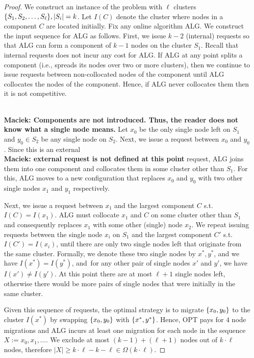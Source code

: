 \documentclass[manuscript,screen=true]{acmart}
\newcommand{\ALG}{\textsf{ALG}\xspace}
\newcommand{\PPOBRP}{PP-BRP}
\DeclarePairedDelimiter\set{\{}{\}}
\newcommand\maciek[1]{\color{brown}\textbf{\\ Maciek: #1}\color{black}}
\begin{document}
\begin{proof}
	We construct an instance of the problem with $\ell$ clusters 
	$\set{ S_1, S_2,\dots , S_{\ell}}, |S_i|  = k$.
	Let $I(C)$ denote the cluster where nodes in a component $C$ are located initially.
	Fix any online algorithm \ALG{}.
	We construct the input sequence for \ALG{} as follows.
	First,
	we issue $k-2$ (internal) requests so that \ALG{} can form a component of $k-1$
	nodes on the cluster $S_1$.
	Recall that internal requests does not incur any cost for \ALG{}.
	If \ALG{} at any point splits a component
	(i.e., spreads its nodes over two or more clusters),
	then we continue to issue requests between non-collocated nodes of the component until \ALG{} collocates the nodes of the component.
	Hence, if \ALG{} never collocates them then it is not competitive.
  
  \maciek{Components are not introduced. Thus, the reader does not know what a single node means.}
	Let $x_0$  be the only single node left on $S_1$ and  $y_0 \in S_2$ be any single node on $S_2$.
	Next,
	we issue a request between $x_0$ and $y_0$.
	Since this is an external \maciek{external request is not defined at this point} request,
	\ALG{} joins them into one component and collocates them in some cluster other than $S_1$.
	For this,
	\ALG{} moves to a new configuration
	that replaces $x_0$ and $y_0$ with two other single nodes $x_1$ and $y_1$ respectively.
	
	Next,
	we issue a request between $x_1$ and the largest component $C$ s.t.~$I(C) = I(x_1)$.
	\ALG{} must collocate $x_1$ and $C$ on some cluster other than $S_1$ and
	consequently replaces $x_1$ with some other (single) node $x_2$.
	We repeat issuing requests between the single node $x_i$ on $S_1$ and the largest component $C'$ s.t.~$I(C')=I(x_i)$,
  until there are only two single nodes left that  originate from the same cluster.
	Formally, we denote these two single nodes by $x^*, y^*$, and we have $I(x^*) = I(y^*)$, and~for any other pair of single nodes
	$x'$ and $y'$,
	we have $I(x') \neq I(y')$.
	At this point there are at most $\ell+1$ single nodes left,
	otherwise there would be more pairs of single nodes that were initially in the same cluster.
	
	Given this sequence of requests,
	the optimal strategy is to migrate $\set{x_0,y_0}$ to the cluster $I(x^*)$ by
	swapping $\set{x_0,y_0}$ with $\set{x^*,y^*}$.
	Hence,
	OPT pays for $4$ node migrations and
	\ALG{} incurs at least one migration for each node in the sequence $X := x_0, x_1,\dots$.
	We exclude at most $(k-1) + ( \ell+1)$ nodes out of $k \cdot \ell$ nodes,
	therefore $|X| \geq k \cdot \ell - k - \ell \in \Omega(k\cdot\ell)$.
\end{proof}
\end{document}
